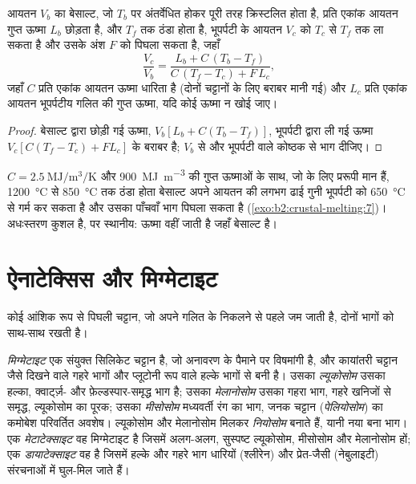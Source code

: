 \begin{proposition}\label{prop:b2:crustal-melting:heat}
आयतन $V_b$ का बेसाल्ट, जो $T_b$ पर अंतर्वेधित होकर पूरी तरह क्रिस्टलित होता है, प्रति एकांक आयतन
गुप्त ऊष्मा $L_b$ छोड़ता है, और $T_f$ तक ठंडा होता है, भूपर्पटी के आयतन $V_c$ को
$T_c$ से $T_f$ तक ला सकता है और उसके अंश $F$ को पिघला सकता है, जहाँ
\[\frac{V_c}{V_b} = \frac{L_b + C\,(T_b - T_f)}{C\,(T_f - T_c) + F\,L_c},\]
जहाँ $C$ प्रति एकांक आयतन ऊष्मा धारिता है (दोनों चट्टानों के लिए बराबर मानी गई) और $L_c$
प्रति एकांक आयतन भूपर्पटीय गलित की गुप्त ऊष्मा, यदि कोई ऊष्मा न खोई जाए।
\end{proposition}

\begin{proof}
बेसाल्ट द्वारा छोड़ी गई ऊष्मा, $V_b[L_b + C(T_b - T_f)]$, भूपर्पटी द्वारा ली गई ऊष्मा
$V_c[C(T_f - T_c) + F L_c]$ के बराबर है; $V_b$ से और भूपर्पटी वाले कोष्ठक से भाग दीजिए।
\end{proof}

$C = \qty{2.5}{\mega\joule\per\cubic\metre\per\kelvin}$ और
\qty{900}{\mega\joule\per\cubic\metre} की गुप्त ऊष्माओं के साथ, जो  के लिए प्ररूपी मान हैं,
\qty{1200}{\celsius} से \qty{850}{\celsius} तक ठंडा होता बेसाल्ट अपने आयतन की लगभग ढाई गुनी
भूपर्पटी को \qty{650}{\celsius} से गर्म कर सकता है और उसका पाँचवाँ भाग पिघला सकता है (\cref{exo:b2:crustal-melting:7})।
अधःस्तरण कुशल है, पर स्थानीय: ऊष्मा वहीं जाती है जहाँ बेसाल्ट है।

\section{ऐनाटेक्सिस और मिग्मेटाइट}\label{sec:b2:crustal-melting:migmatites}

कोई आंशिक रूप से पिघली चट्टान, जो अपने गलित के निकलने से पहले जम जाती है, दोनों भागों को साथ-साथ रखती है।

\begin{definition}[मिग्मेटाइट और उसके भाग]\label{def:b2:crustal-melting:migmatite}
\emph{मिग्मेटाइट} एक संयुक्त सिलिकेट चट्टान है, जो अनावरण के
पैमाने पर विषमांगी है, और कायांतरी चट्टान जैसे दिखने वाले गहरे भागों और प्लूटोनी रूप वाले हल्के भागों
से बनी है। उसका \emph{ल्यूकोसोम} उसका हल्का, क्वार्ट्ज़- और
फ़ेल्डस्पार-समृद्ध भाग है; उसका \emph{मेलानोसोम} उसका गहरा भाग, गहरे
खनिजों से समृद्ध, ल्यूकोसोम का पूरक; उसका \emph{मीसोसोम} मध्यवर्ती
रंग का भाग, जनक चट्टान (\emph{पेलियोसोम}) का कमोबेश परिवर्तित अवशेष।
ल्यूकोसोम और मेलानोसोम मिलकर \emph{नियोसोम} बनाते हैं, यानी नया बना भाग। एक
\emph{मेटाटेक्साइट} वह मिग्मेटाइट है जिसमें अलग-अलग, सुस्पष्ट ल्यूकोसोम,
मीसोसोम और मेलानोसोम हों; एक \emph{डायाटेक्साइट} वह है जिसमें हल्के और
गहरे भाग धारियों (श्लीरेन) और प्रेत-जैसी (नेबुलाइटी) संरचनाओं में घुल-मिल जाते हैं।
\end{definition}

